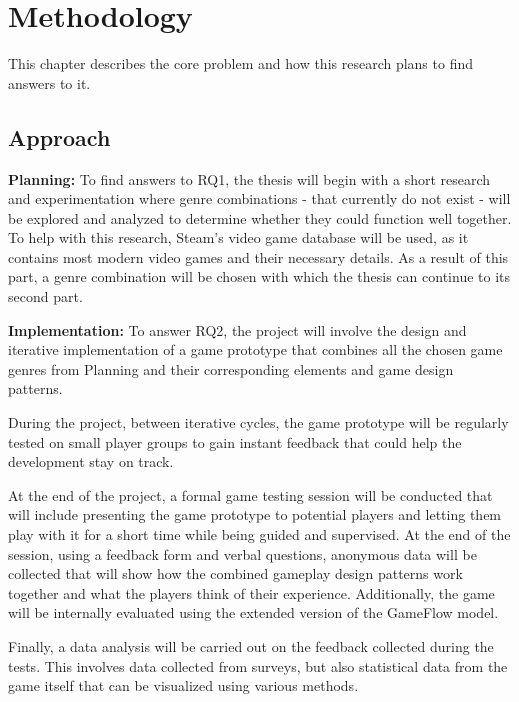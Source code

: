 \chapter{Methodology} \label{Chapter:Methodology}

This chapter describes the core problem and how this research plans to find answers to it.




\section{Approach}

\textbf{Planning:} To find answers to RQ1, the thesis will begin with a short research and experimentation where genre combinations - that currently do not exist - will be explored and analyzed to determine whether they could function well together. To help with this research, Steam's video game database will be used, as it contains most modern video games and their necessary details. As a result of this part, a genre combination will be chosen with which the thesis can continue to its second part.

\textbf{Implementation:} To answer RQ2, the project will involve the design and iterative implementation of a game prototype that combines all the chosen game genres from Planning and their corresponding elements and game design patterns. 

During the project, between iterative cycles, the game prototype will be regularly tested on small player groups to gain instant feedback that could help the development stay on track.

At the end of the project, a formal game testing session will be conducted that will include presenting the game prototype to potential players and letting them play with it for a short time while being guided and supervised. At the end of the session, using a feedback form and verbal questions\cite{björk2015Interviews}, anonymous data will be collected that will show how the combined gameplay design patterns work together and what the players think of their experience. Additionally, the game will be internally evaluated using the extended version of the GameFlow model\cite{sweetser2017gameflow}.

Finally, a data analysis will be carried out on the feedback collected during the tests. This involves data collected from surveys, but also statistical data from the game itself that can be visualized using various methods\cite{björk2015DataVisualization}. 

